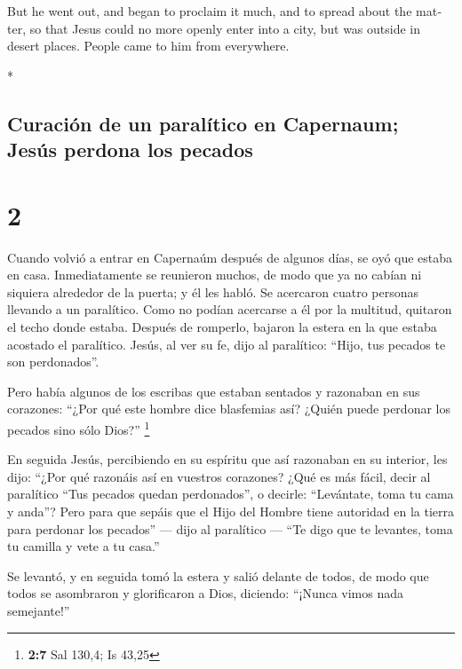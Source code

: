 \begin{paracol}{2}
\begin{otherlanguage}{english}
 But he went out, and began to proclaim it much, and to
spread about the matter, so that Jesus could no more openly enter into a
city, but was outside in desert places. People came to him from
everywhere.

\end{otherlanguage}

\switchcolumn[0]*

\hypertarget{curaciuxf3n-de-un-paraluxedtico-en-capernaum-jesuxfas-perdona-los-pecados}{%
\subsection{Curación de un paralítico en Capernaum; Jesús perdona los
pecados}\label{curaciuxf3n-de-un-paraluxedtico-en-capernaum-jesuxfas-perdona-los-pecados}}

\hypertarget{section-2}{%
\section{2}\label{section-2}}

 Cuando volvió a entrar en Capernaúm después de algunos
días, se oyó que estaba en casa.  Inmediatamente se
reunieron muchos, de modo que ya no cabían ni siquiera alrededor de la
puerta; y él les habló.  Se acercaron cuatro personas
llevando a un paralítico.  Como no podían acercarse a él
por la multitud, quitaron el techo donde estaba. Después de romperlo,
bajaron la estera en la que estaba acostado el paralítico.
 Jesús, al ver su fe, dijo al paralítico: ``Hijo, tus
pecados te son perdonados''.

 Pero había algunos de los escribas que estaban sentados y
razonaban en sus corazones:  ``¿Por qué este hombre dice
blasfemias así? ¿Quién puede perdonar los pecados sino sólo Dios?''
\footnote{\textbf{2:7} Sal 130,4; Is 43,25}

 En seguida Jesús, percibiendo en su espíritu que así
razonaban en su interior, les dijo: ``¿Por qué razonáis así en vuestros
corazones?  ¿Qué es más fácil, decir al paralítico ``Tus
pecados quedan perdonados'', o decirle: ``Levántate, toma tu cama y
anda''?  Pero para que sepáis que el Hijo del Hombre
tiene autoridad en la tierra para perdonar los pecados'' --- dijo al
paralítico ---  ``Te digo que te levantes, toma tu
camilla y vete a tu casa.''

 Se levantó, y en seguida tomó la estera y salió delante
de todos, de modo que todos se asombraron y glorificaron a Dios,
diciendo: ``¡Nunca vimos nada semejante!''


\end{paracol}
